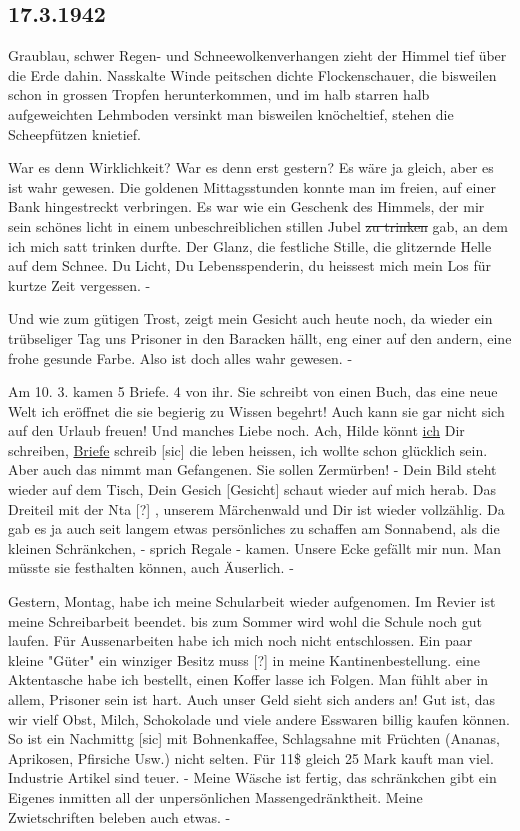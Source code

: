 \subsection{17.3.1942}

Graublau, schwer Regen- und Schneewolkenverhangen zieht der Himmel tief \"{u}ber die Erde dahin.
Nasskalte Winde peitschen dichte Flockenschauer, die bisweilen schon in grossen Tropfen herunterkommen, und im halb starren halb aufgeweichten Lehmboden versinkt man bisweilen kn\"{o}cheltief, stehen die Scheepf\"{u}tzen knietief.

War es denn Wirklichkeit?
War es denn erst gestern?
Es w\"{a}re ja gleich, aber es ist wahr gewesen.
Die goldenen Mittagsstunden konnte man im freien, auf einer Bank hingestreckt verbringen.
Es war wie ein Geschenk des Himmels, der mir sein sch\"{o}nes licht in einem unbeschreiblichen stillen Jubel \st{zu trinken} gab, an dem ich mich satt trinken durfte.
Der Glanz, die festliche Stille, die glitzernde Helle auf dem Schnee.
Du Licht, Du Lebensspenderin, du heissest mich mein Los f\"{u}r kurtze Zeit vergessen. -

Und wie zum g\"{u}tigen Trost, zeigt mein Gesicht auch heute noch, da wieder ein tr\"{u}bseliger Tag uns Prisoner in den Baracken h\"{a}llt, eng einer auf den andern, eine frohe gesunde Farbe.
Also ist doch alles wahr gewesen. -

Am 10. 3. kamen 5 Briefe.
4 von ihr.
Sie schreibt von einen Buch, das eine neue Welt ich er\"{o}ffnet die sie begierig zu Wissen begehrt!
Auch kann sie gar nicht sich auf den Urlaub freuen!
Und manches Liebe noch.
Ach, Hilde k\"{o}nnt \ul{ich} Dir schreiben, \ul{Briefe} schreib{\color{red} [sic] } die leben heissen, ich wollte schon gl\"{u}cklich sein.
Aber auch das nimmt man Gefangenen.
Sie sollen Zerm\"{u}rben!
- Dein Bild steht wieder auf dem Tisch, Dein Gesich{\color{red} [Gesicht] } schaut wieder auf mich herab.
Das Dreiteil mit der Nta{\color{red} [?] }, unserem M\"{a}rchenwald und Dir ist wieder vollz\"{a}hlig.
Da gab es ja auch seit langem etwas pers\"{o}nliches zu schaffen am Sonnabend, als die kleinen Schr\"{a}nkchen, - sprich Regale - kamen.
Unsere Ecke gef\"{a}llt mir nun.
Man m\"{u}sste sie festhalten k\"{o}nnen, auch \"{A}userlich. -

Gestern, Montag, habe ich meine Schularbeit wieder aufgenomen.
Im Revier ist meine Schreibarbeit beendet.
bis zum Sommer wird wohl die Schule noch gut laufen.
F\"{u}r Aussenarbeiten habe ich mich noch nicht entschlossen.
Ein paar kleine "G\"{u}ter" ein winziger Besitz muss{\color{red} [?] } in meine Kantinenbestellung.
eine Aktentasche habe ich bestellt, einen Koffer lasse ich Folgen.
Man f\"{u}hlt aber in allem, Prisoner sein ist hart.
Auch unser Geld sieht sich anders an!
Gut ist, das wir vielf Obst, Milch, Schokolade und viele andere Esswaren billig kaufen k\"{o}nnen.
So ist ein Nachmittg{\color{red} [sic] } mit Bohnenkaffee, Schlagsahne mit Fr\"{u}chten (Ananas, Aprikosen, Pfirsiche Usw.) nicht selten.
F\"{u}r 11{\$} gleich 25 Mark kauft man viel.
Industrie Artikel sind teuer.
- Meine W\"{a}sche ist fertig, das schr\"{a}nkchen gibt ein Eigenes inmitten all der unpers\"{o}nlichen Massengedr\"{a}nktheit.
Meine Zwietschriften beleben auch etwas. -

